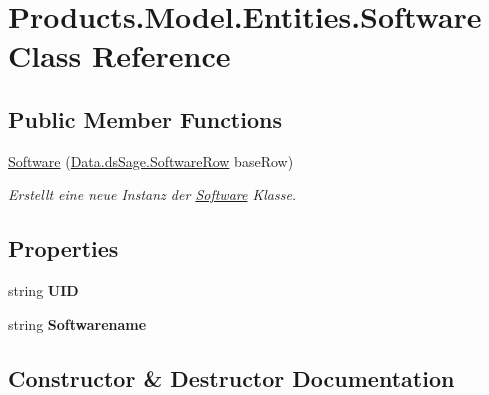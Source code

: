 \hypertarget{class_products_1_1_model_1_1_entities_1_1_software}{}\section{Products.\+Model.\+Entities.\+Software Class Reference}
\label{class_products_1_1_model_1_1_entities_1_1_software}
\subsection*{Public Member Functions}
\begin{DoxyCompactItemize}
\item 
\hyperlink{class_products_1_1_model_1_1_entities_1_1_software_a0fbce60121d3083020a5ab6d5959c736}{Software} (\hyperlink{class_products_1_1_data_1_1ds_sage_1_1_software_row}{Data.\+ds\+Sage.\+Software\+Row} base\+Row)
\begin{DoxyCompactList}\small\item\em Erstellt eine neue Instanz der \hyperlink{class_products_1_1_model_1_1_entities_1_1_software}{Software} Klasse. \end{DoxyCompactList}\end{DoxyCompactItemize}
\subsection*{Properties}
\begin{DoxyCompactItemize}
\item 
string {\bfseries U\+ID}\hypertarget{class_products_1_1_model_1_1_entities_1_1_software_aa0efefe14f0ec8fc6e6e545e1b4094d5}{}\label{class_products_1_1_model_1_1_entities_1_1_software_aa0efefe14f0ec8fc6e6e545e1b4094d5}

\item 
string {\bfseries Softwarename}\hypertarget{class_products_1_1_model_1_1_entities_1_1_software_a01bf46f2bf9e51b53fc307b5cc2d4b39}{}\label{class_products_1_1_model_1_1_entities_1_1_software_a01bf46f2bf9e51b53fc307b5cc2d4b39}

\end{DoxyCompactItemize}


\subsection{Constructor \& Destructor Documentation}
